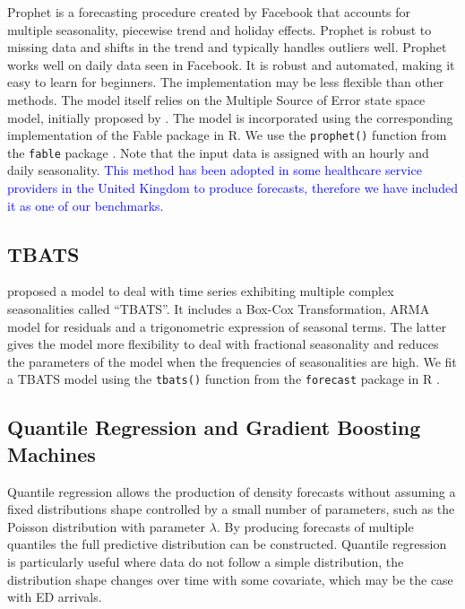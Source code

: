 \documentclass[]{elsarticle} %
\begin{document}
Prophet is a forecasting procedure created by Facebook
\citep{taylor2018forecasting} that accounts for multiple seasonality,
piecewise trend and holiday effects. Prophet is robust to missing data
and shifts in the trend and typically handles outliers well. Prophet
works well on daily data seen in Facebook. It is robust and automated,
making it easy to learn for beginners. The implementation may be less
flexible than other methods. The model itself relies on the Multiple
Source of Error state space model, initially proposed by \citet{Kalman1960}.
The model is incorporated using the corresponding implementation of the
Fable package in R. We use the \texttt{prophet()} function from the \texttt{fable}
package \citep{fable2020}. Note that the input data is assigned with an
hourly and daily seasonality. \textcolor{blue}{This method has been adopted in some healthcare service providers in the United Kingdom to produce forecasts, therefore we have included it as one of our benchmarks.}

\hypertarget{tbats}{%
\subsection{TBATS}\label{tbats}}

\citet{de2011forecasting} proposed a model to deal with time series exhibiting
multiple complex seasonalities called ``TBATS''. It includes a Box-Cox
Transformation, ARMA model for residuals and a trigonometric expression
of seasonal terms. The latter gives the model more flexibility to deal
with fractional seasonality and reduces the parameters of the model when
the frequencies of seasonalities are high. We fit a TBATS model using
the \texttt{tbats()} function from the \texttt{forecast} package in R
\citep{forecastpackage2020}.

\hypertarget{quantile-regression-and-gradient-boosting-machines}{%
\subsection{Quantile Regression and Gradient Boosting Machines}\label{quantile-regression-and-gradient-boosting-machines}}

Quantile regression allows the production of density forecasts without
assuming a fixed distributions shape controlled by a small number of
parameters, such as the Poisson distribution with parameter \(\lambda\).
By producing forecasts of multiple quantiles the full predictive
distribution can be constructed. Quantile regression is particularly
useful where data do not follow a simple distribution, the
distribution shape changes over time with some covariate, which may
be the case with ED arrivals.
\end{document}
